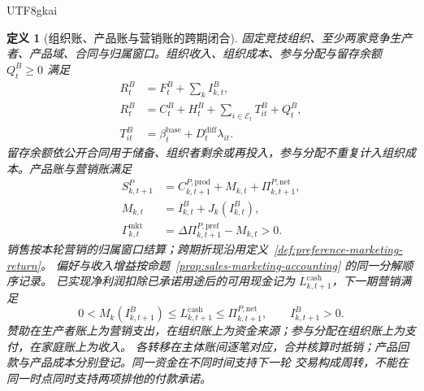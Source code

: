 \documentclass[12pt,a4paper,openany]{report}
\newtheorem{definition}{定义}[chapter]
\begin{document}
\begin{CJK*}{UTF8}{gkai}
\begin{definition}[组织账、产品账与营销账的跨期闭合]
\label{def:closed-cycle-ledgers}
固定竞技组织、至少两家竞争生产者、产品域、合同与归属窗口。组织收入、组织成本、参与分配与留存余额
\(Q_t^B\ge0\) 满足
\[
\begin{aligned}
  R_t^B&=F_t^B+\sum_k I_{k,t}^B,\\
  R_t^B&=C_t^B+H_t^B
       +\sum_{i\in\mathcal E_t}T_{it}^B+Q_t^B,\\
  T_{it}^B&=\beta_t^{\mathrm{base}}+D_t^{\mathrm{diff}}\lambda_{it}.
\end{aligned}
\]
留存余额依公开合同用于储备、组织者剩余或再投入，参与分配不重复计入组织成本。产品账与营销账满足
\[
\begin{aligned}
  S_{k,t+1}^P
    &=C_{k,t+1}^{P,\mathrm{prod}}+M_{k,t}+\Pi_{k,t+1}^{P,\mathrm{net}},\\
  M_{k,t}&=I_{k,t}^B+J_k(I_{k,t}^B),\\
  \Gamma_{k,t}^{\mathrm{mkt}}
    &=\Delta\Pi_{k,t+1}^{P,\mathrm{pref}}-M_{k,t}>0.
\end{aligned}
\]
销售按本轮营销的归属窗口结算；跨期折现沿用定义~\ref{def:preference-marketing-return}。
偏好与收入增益按命题~\ref{prop:sales-marketing-accounting} 的同一分解顺序记录。
已实现净利润扣除已承诺用途后的可用现金记为 \(L_{k,t+1}^{\mathrm{cash}}\)，下一期营销满足
\[
  0<M_k(I_{k,t+1}^B)\le L_{k,t+1}^{\mathrm{cash}}
    \le\Pi_{k,t+1}^{P,\mathrm{net}},
  \qquad I_{k,t+1}^B>0.
\]
赞助在生产者账上为营销支出，在组织账上为资金来源；参与分配在组织账上为支付，在家庭账上为收入。
各转移在主体账间逐笔对应，合并核算时抵销；产品回款与产品成本分别登记。同一资金在不同时间支持下一轮
交易构成周转，不能在同一时点同时支持两项排他的付款承诺。
\end{definition}


\end{CJK*}
\end{document}
